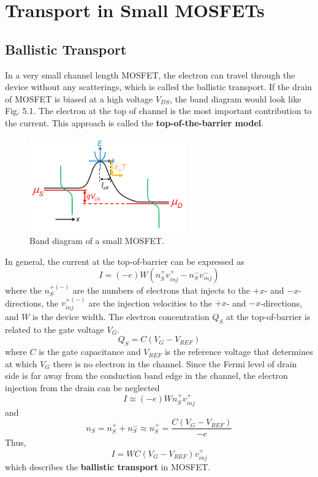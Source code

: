 \chapter{Transport in Small MOSFETs}
\section{Ballistic Transport}
In a very small channel length MOSFET, the electron can travel through the device without any scatterings, which is called the ballistic transport. If the drain of MOSFET is biased at a high voltage $V_{DS}$, the band diagram would look like Fig. 5.1. The electron at the top of channel is the most important contribution to the current. This approach is called the {\bf top-of-the-barrier model}.
\begin{figure}[tbp]
\includegraphics[width=0.6\textwidth]{figures/Fig5_1}
\centering
\caption{\small Band diagram of a small MOSFET.}
\end{figure}
In general, the current at the top-of-barrier can be expressed as \begin{equation}
    I = (-e)W(n_{S}^{+}v_{inj}^{+}-n_{S}^{-}v_{inj}^{-})
\end{equation} where the $n_{S}^{+(-)}$ are the numbers of electrons that injects to the $+x$- and $-x$-directions, the $v_{inj}^{+(-)}$ are the injection velocities to the $+x$- and $-x$-directions, and $W$ is the device width. The electron concentration $Q_{S}$ at the top-of-barrier is related to the gate voltage $V_{G}$. \begin{equation}
    Q_{S} = C(V_{G}-V_{REF})
\end{equation} where $C$ is the gate capacitance and $V_{REF}$ is the reference voltage that determines at which $V_{G}$ there is no electron in the channel. Since the Fermi level of drain side is far away from the conduction band edge in the channel, the electron injection from the drain can be neglected \begin{equation}
    I \approx (-e)Wn_{S}^{+}v_{inj}^{+}
\end{equation} and \begin{equation}
    n_{S} = n_{S}^{+} + n_{S}^{-} \approx n_{S}^{+} = \frac{C(V_{G}-V_{REF})}{-e}
\end{equation} Thus, \begin{equation}
    I = WC(V_{G}-V_{REF})v_{inj}^{+}
\end{equation} which describes the {\bf ballistic transport} in MOSFET.
